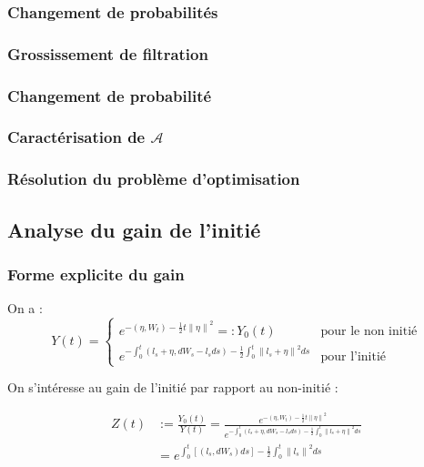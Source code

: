 \documentclass{beamer}
\begin{document}
\begin{frame}
\frametitle{Changement de probabilités}
\end{frame}

\begin{frame}
\frametitle{Grossissement de filtration}
\end{frame}

\begin{frame}
\frametitle{Changement de probabilité}
\end{frame}

\begin{frame}
\frametitle{Caractérisation de $\mathcal{A}$}
\end{frame}

\begin{frame}
\frametitle{Résolution du problème d'optimisation}
\end{frame}

\subsection{Analyse du gain de l'initié}

\begin{frame}
\frametitle{Forme explicite du gain}
\par On a :
\begin{displaymath}
Y \left( t \right) = 
\begin{cases}
e^{- \left( \eta, W_{t} \right)-\frac{1}{2} t {\| \eta \|}^{2}} =: Y_0 \left( t \right) & \text{pour le non initié} \\
e^{- \int_{0}^{t} \left( l_{s} + \eta, dW_{s} - l_s ds \right) - \frac{1}{2} \int_{0}^{t} {\| l_{s} + \eta \|}^{2} ds} & \text{pour l'initié}
\end{cases}
\end{displaymath}

\par On s'intéresse au gain de l'initié par rapport au non-initié : 

\begin{displaymath}
	\begin{split}
	Z \left( t \right) &:= \frac{Y_0 \left( t \right)}{Y \left( t \right)} = \frac{ e^{- \left( \eta, W_{t} \right)-\frac{1}{2} t {\| \eta \|}^{2}}}{e^{- \int_{0}^{t} \left( l_{s} + \eta, dW_{s} - l_s ds \right) - \frac{1}{2} \int_{0}^{t} {\| l_{s} + \eta \|}^{2} ds}} \\
	&= e^{ \int_{0}^{t} \left[ \left( l_s, dW_{s} \right) ds \right] - \frac{1}{2} \int_{0}^{t} {\| l_{s} \|}^{2} ds}
	\end{split}
\end{displaymath}
\end{frame}
 
\end{document}
